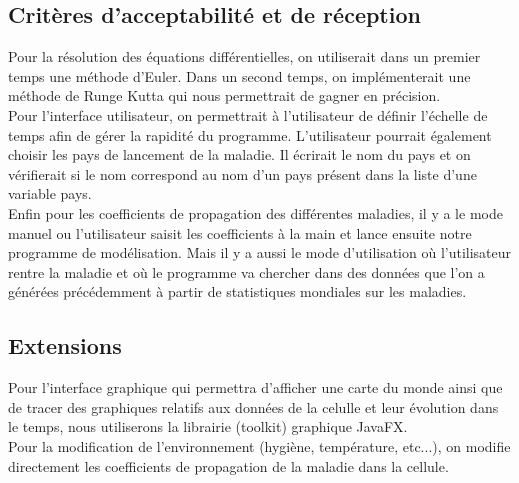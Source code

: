 \documentclass[12pt,a4paper]{report}
\begin{document}
\subsection*{Critères d'acceptabilité et de réception}
\begin{flushleft}
	Pour la résolution des équations différentielles, on utiliserait dans un premier temps une méthode d'Euler. Dans un second temps, on implémenterait une méthode de Runge Kutta qui nous permettrait de gagner en précision. \\
	Pour l'interface utilisateur, on permettrait à l'utilisateur de définir l'échelle de temps afin de gérer la rapidité du programme. L'utilisateur pourrait également choisir les pays de lancement de la maladie. Il écrirait le nom du pays et on vérifierait si le nom correspond au nom d'un pays présent dans la liste d'une variable pays. \\
	Enfin pour les coefficients de propagation des différentes maladies, il y a le mode manuel ou l'utilisateur saisit les coefficients à la main et lance ensuite notre programme de modélisation. Mais il y a aussi le mode d'utilisation où l'utilisateur 
rentre la maladie et où le programme va chercher dans des données que l'on a générées précédemment à partir de statistiques mondiales sur les maladies.
\end{flushleft}

\subsection*{Extensions}
\begin{flushleft}
 	Pour l'interface graphique qui permettra d'afficher une carte du monde ainsi que de tracer des graphiques relatifs aux données de la celulle et leur évolution dans le temps, nous utiliserons la librairie (toolkit) graphique JavaFX. \\
	Pour la modification de l'environnement (hygiène, température, etc...), on modifie directement les coefficients de propagation de la maladie dans la cellule.
\end{flushleft}
\end{document}
